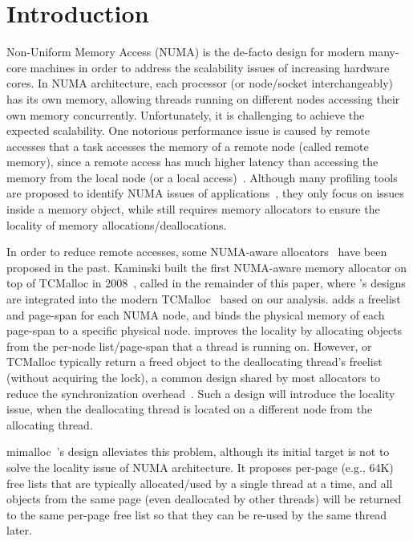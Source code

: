 
\section{Introduction}
\label{sec:intro}


Non-Uniform Memory Access (NUMA) is the de-facto design for modern many-core machines in order to address the scalability issues of increasing hardware cores. In NUMA architecture, each processor (or node/socket interchangeably) has its own memory, allowing threads running on different nodes accessing their own memory concurrently. Unfortunately, it is challenging to achieve the expected scalability. One notorious performance issue is caused by remote accesses that a task accesses the memory of a remote node (called remote memory), since a remote access has much higher latency than accessing the memory from the local node (or a local access)~\cite{Blagodurov:2011:CNC:2002181.2002182}. Although many profiling tools are proposed to identify NUMA issues of applications~\cite{Intel:VTune, Memphis, Lachaize:2012:MMP:2342821.2342826, XuNuma, NumaMMA, 7847070, NumaPerf}, they only focus on issues inside a memory object, while still requires memory allocators to ensure the locality of memory allocations/deallocations. 

In order to reduce remote accesses, some NUMA-aware allocators~\cite{tcmallocnuma, kim2013node, yang2019jarena} have been proposed in the past. Kaminski built the first NUMA-aware memory allocator on top of TCMalloc in 2008~\cite{tcmallocnuma}, called \TN{} in the remainder of this paper, where \TN{}'s designs are integrated into the modern TCMalloc~\cite{tcmalloc2} based on our analysis. \TN{} adds a freelist and page-span for each NUMA node, and binds the physical memory of each page-span to a specific physical node. \TN{} improves the locality by allocating objects from the per-node list/page-span that a thread is running on. However, \TN{} or TCMalloc typically return a freed object to the deallocating thread's freelist (without acquiring the lock), a common design shared by most allocators to reduce the synchronization overhead~\cite{Hoard}. Such a design will introduce the locality issue, when the deallocating thread is located on a different node from the allocating thread.  

mimalloc~\cite{mimalloc}'s design alleviates this problem, although its initial target is not to solve the locality issue of NUMA architecture. It proposes per-page (e.g., 64K) free lists that are typically allocated/used by a single thread at a time, and all objects from the same page (even deallocated by other threads) will be returned to the same per-page free list so that they can be re-used by the same thread later. 


